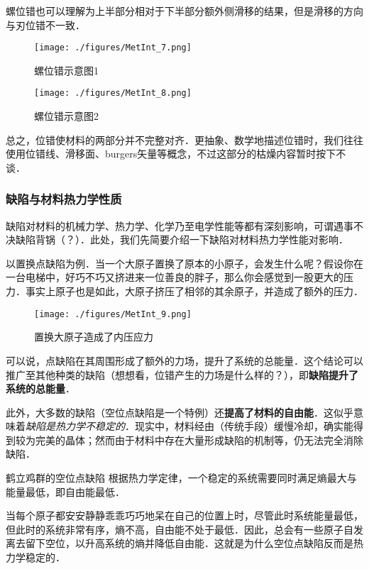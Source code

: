螺位错也可以理解为上半部分相对于下半部分额外侧滑移的结果，但是滑移的方向与刃位错不一致．
\begin{figure}[ht]
\centering
\texttt{[image: ./figures/MetInt\_7.png]}
\caption{螺位错示意图1} \label{MetInt_fig7}
\end{figure}
\begin{figure}[ht]
\centering
\texttt{[image: ./figures/MetInt\_8.png]}
\caption{螺位错示意图2} \label{MetInt_fig8}
\end{figure}

总之，位错使材料的两部分并不完整对齐．更抽象、数学地描述位错时，我们往往使用位错线、滑移面、burgers矢量等概念，不过这部分的枯燥内容暂时按下不谈．


\subsubsection{缺陷与材料热力学性质}
缺陷对材料的机械力学、热力学、化学乃至电学性能等都有深刻影响，可谓遇事不决缺陷背锅（？）．此处，我们先简要介绍一下缺陷对材料热力学性能对影响．

以置换点缺陷为例．当一个大原子置换了原本的小原子，会发生什么呢？假设你在一台电梯中，好巧不巧又挤进来一位善良的胖子，那么你会感觉到一股更大的压力．事实上原子也是如此，大原子挤压了相邻的其余原子，并造成了额外的压力．
\begin{figure}[ht]
\centering
\texttt{[image: ./figures/MetInt\_9.png]}
\caption{置换大原子造成了内压应力} \label{MetInt_fig9}
\end{figure}
可以说，点缺陷在其周围形成了额外的力场，提升了系统的总能量．这个结论可以推广至其他种类的缺陷（想想看，位错产生的力场是什么样的？），即\textbf{缺陷提升了系统的总能量}．

此外，大多数的缺陷（空位点缺陷是一个特例）还\textbf{提高了材料的自由能}．这似乎意味着\textsl{缺陷是热力学不稳定的}．现实中，材料经由（传统手段）缓慢冷却，确实能得到较为完美的晶体；然而由于材料中存在大量形成缺陷的机制等，仍无法完全消除缺陷．

\begin{example}{鹤立鸡群的空位点缺陷}
根据热力学定律，一个稳定的系统需要同时满足熵最大与能量最低，即自由能最低．

当每个原子都安安静静乖乖巧巧地呆在自己的位置上时，尽管此时系统能量最低，但此时的系统非常有序，熵不高，自由能不处于最低．因此，总会有一些原子自发离去留下空位，以升高系统的熵并降低自由能．这就是为什么空位点缺陷反而是热力学稳定的．
\end{example}

